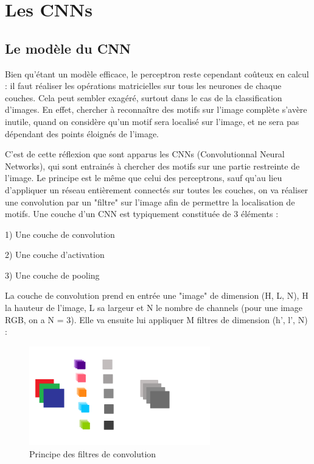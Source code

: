 \section{Les CNNs}

\fancyhead[R]{\textit{\nouppercase{\leftmark}}}

\subsection{Le modèle du CNN}

Bien qu'étant un modèle efficace, le perceptron reste cependant coûteux en calcul : il faut réaliser les opérations matricielles sur tous les neurones de chaque couches.
Cela peut sembler exagéré, surtout dans le cas de la classification d'images. 
En effet, chercher à reconnaître des motifs sur l'image complète s'avère inutile, quand on considère qu'un motif sera localisé sur l'image, et ne sera pas dépendant des points éloignés de l'image.

C'est de cette réflexion que sont apparus les CNNs (Convolutionnal Neural Networks), qui sont entrainés à chercher des motifs sur une partie restreinte de l'image.
Le principe est le même que celui des perceptrons, sauf qu'au lieu d'appliquer un réseau entièrement connectés sur toutes les couches, on va réaliser une convolution par un "filtre" sur l'image afin de permettre la localisation de motifs.
Une couche d'un CNN est typiquement constituée de 3 éléments : 

1) Une couche de convolution

2) Une couche d'activation 

3) Une couche de pooling


La couche de convolution prend en entrée une "image" de dimension (H, L, N), H la hauteur de l'image, L sa largeur et N le nombre de channels (pour une image RGB, on a N = 3). 
Elle va ensuite lui appliquer M filtres de dimension (h', l', N) :

\begin{figure}[h]
 \centering
 \includegraphics[width=0.7\textwidth]{img/CNN_filtres.png}
 \caption{Principe des filtres de convolution}
\end{figure}

